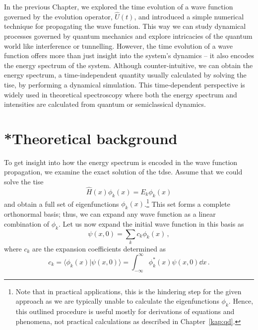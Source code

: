 In the previous Chapter, we explored the time evolution of a wave function governed by the evolution operator, $\hat{U}(t)$, and introduced a simple numerical technique for propagating the wave function. This way we can study dynamical processes governed by quantum mechanics and explore intricacies of the quantum world like interference or tunnelling. However, the time evolution of a wave function offers more than just insight into the system's dynamics -- it also encodes the energy spectrum of the system. Although counter-intuitive, we can obtain the energy spectrum, a time-independent quantity usually calculated by solving the \acrfull{tise}, by performing a dynamical simulation. This time-dependent perspective is widely used in theoretical spectroscopy where both the energy spectrum and intensities are calculated from quantum or semiclassical dynamics.

\section{*Theoretical background}
\label{sec:autocorrintro}

To get insight into how the energy spectrum is encoded in the wave function propagation, we examine the exact solution of the \acrlong{tdse}. Assume that we could solve the \acrshort{tise}
\begin{equation}
    \hat{H}(x) \phi_k(x) = E_k \phi_k(x)
    \label{eq:tise0}
\end{equation}
and obtain a full set of eigenfunctions $\phi_k(x)$.\footnote{Note that in practical applications, this is the hindering step for the given approach as we are typically unable to calculate the eigenfunctions $\phi_k$. Hence, this outlined procedure is useful mostly for derivations of equations and phenomena, not practical calculations as described in Chapter~\ref{kap:qd}.} This set forms a complete orthonormal basis; thus, we can expand any wave function as a linear combination of $\phi_k$. Let us now expand the initial wave function in this basis as
\begin{equation}
    \psi(x,0) = \sum_k c_k \phi_k(x) \, ,
\end{equation}
where $c_k$ are the expansion coefficients determined as 
\begin{equation}
    c_k = \langle \phi_k(x) | \psi(x,0) \rangle = \int_{-\infty}^\infty \phi_k^*(x) \psi(x,0) \dd x \, .
    \label{eq:psi0v1}
\end{equation}

